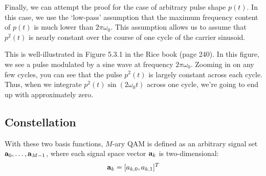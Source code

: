 Finally, we can attempt the proof for the case of arbitrary pulse
shape $p(t)$.  In this case, we use the `low-pass' assumption that
the maximum frequency content of $p(t)$ is much lower than $2\pi
\omega_0$.  This assumption allows us to assume that $p^2(t)$ is
nearly constant over the course of one cycle of the carrier
sinusoid.

This is well-illustrated in Figure 5.3.1 in the Rice book (page 240).
In this figure, we see a pulse modulated by a sine wave at frequency
$2\pi\omega_0$.  Zooming in on any few cycles, you can see that the
pulse $p^2(t)$ is largely constant across each cycle.  Thus, when we
integrate $p^2(t) \sin(2 \omega_0 t)$ across one cycle, we're going
to end up with approximately zero. 


\subsection{Constellation}

With these two basis functions, $M$-ary QAM is defined as an
arbitrary signal set $\mathbf{a}_0, \ldots, \mathbf{a}_{M-1}$, where each signal
space vector $\mathbf{a}_k$ is two-dimensional:
\[
  \mathbf{a}_k = [a_{k,0}, a_{k,1}]^T
\]

